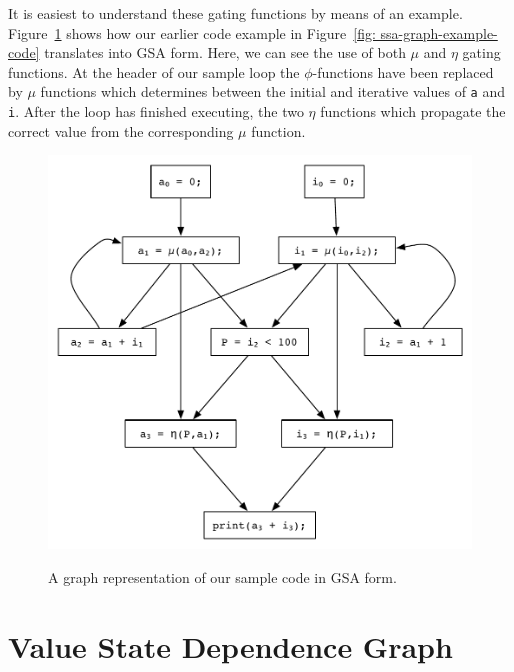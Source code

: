 It is easiest to understand these gating functions by means of an example. Figure~\ref{fig: gsa-graph-example} shows how our earlier code example in Figure~\ref{fig: ssa-graph-example-code} translates into GSA form. Here, we can see the use of both $\mu$ and $\eta$ gating functions. At the header of our sample loop the $\phi$-functions have been replaced by $\mu$ functions which determines between the initial and iterative values of \texttt{a} and \texttt{i}. After the loop has finished executing, the two $\eta$ functions which propagate the correct value from the corresponding $\mu$ function.

\begin{figure}
\centering
\includegraphics[scale=0.55]{gsa-example.pdf}
\label{fig: gsa-graph-example}
\caption{A graph representation of our sample code in GSA form.}
\end{figure}


\section{Value State Dependence Graph}

